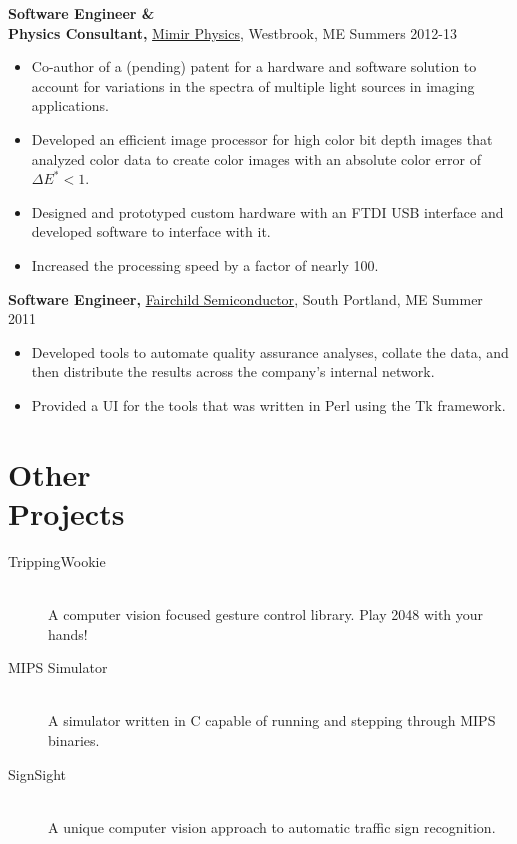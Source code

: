\documentclass[margin]{res}
\begin{document}
\begin{resume}
{\bf Software Engineer \& \\ Physics Consultant,} \uline{Mimir Physics}, Westbrook, ME \hfill Summers 2012-13
 \begin{itemize} \itemsep -2pt  %
 \item Co-author of a (pending) patent for a hardware and software solution to account for variations in the spectra of multiple light sources in imaging applications.
 \item Developed an efficient image processor for high color bit depth images that analyzed color data to create color images with an absolute color error of $\Delta E^* < 1$.
 \item Designed and prototyped custom hardware with an FTDI USB interface  and developed software to interface with it.
 \item Increased the processing speed by a factor of nearly 100.
 \end{itemize}

 
 
{\bf Software Engineer,} \uline{Fairchild Semiconductor}, South Portland, ME \hfill  Summer 2011
\begin{itemize} \itemsep -2pt %
 \item Developed tools to automate quality assurance analyses, collate the data, and then distribute the results across the company's internal network.
 \item Provided a UI for the tools that was written in Perl using the Tk framework.
\end{itemize}

\section{Other \\ Projects}
\begin{description}
	\item[TrippingWookie] \hfil \\
		A computer vision focused gesture control library. Play 2048 with your hands!
	\item[MIPS Simulator] \hfil \\
		A simulator written in C capable of running and stepping through MIPS binaries.
	\item[SignSight] \hfil \\
		A unique computer vision approach to automatic traffic sign recognition.
\end{description}


\end{resume}
\end{document}
